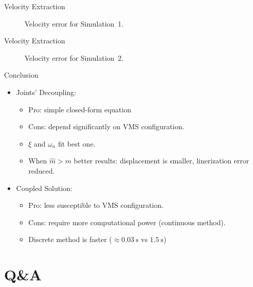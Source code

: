 \begin{frame}{Velocity Extraction}
  \begin{figure}
    \centering
    \subfloat[]{} \quad
    \subfloat[]{}
    \caption{Velocity error for Simulation~1.}
  \end{figure}
\end{frame}

\begin{frame}{Velocity Extraction}
  \begin{figure}
    \centering
    \subfloat[]{} \quad
    \subfloat[]{}
    \caption{Velocity error for Simulation~2.}
  \end{figure}
\end{frame}

\begin{frame}{Conclusion}
  \begin{itemize}
    \item Joints' Decoupling:
    \begin{itemize}
      \item Pro: simple closed-form equation
      \item Cons: depend significantly on VMS configuration.
      \item $\xi$ and $\omega_n$ fit best one.
      \item When $\hat{m}>m$ better results: displacement is smaller, linerization error reduced.
    \end{itemize}
    \item Coupled Solution:
    \begin{itemize}
      \item Pro: less susceptible to VMS configuration.
      \item Cons: require more computational power (continuous method).
      \item Discrete method is faster ($\approx \SI{0.03}{\second}$ vs $\SI{1.5}{\second}$)
    \end{itemize}
  \end{itemize}
\end{frame}

\bibliographpage

\backmatter

\section{Q\&A}

